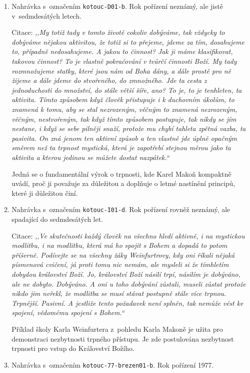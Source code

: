 \begin{enumerate}
  \item{
    Nahrávka s~označením \texttt{kotouc-D01-b}. Rok pořízení neznámý, ale
    jistě v~sedmdesátých letech.

    Citace: \textit{%
      ,,My totiž tady v tomto životě cokoliv dobýváme, tak vždycky to dobýváme
      nějakou aktivitou, že totiž si to přejeme, jdeme za tím, dosahujeme to,
      případně nedosahujeme. A jakou to činnost? Jak ji máme klasifikovat,
      takovou činnost? To je vlastně pokračování v tvůrčí činnosti Boží. My tady
      rozmnožujeme statky, které jsou nám od Boha dány, a dále prostě pro ně
      žijeme a dále jdeme do stvořeného, do zmnožného. Jde ta cesta z
      jednoduchosti do množství, do stále větší šíře, ano? To je, to je
      tenhleten, ta aktivita. Tímto způsobem když člověk přistupuje i k
      duchovním úkolům, to znamená k tomu, aby se stal nezrozeným, věčným to
      znamená nezrozeným, věčným, nestvořeným, tak když tímto způsobem
      postupuje, tak nikdy se jím nestane, i když se sebe pilněji snaží, protože
      mu chybí tahleta zpětná vazba, ta pasivita. On zná jenom ten aktivní
      způsob a ten vlastně jde úplně opačným směrem než ta trpnost mystická,
      která je zapotřebí stejnou měrou jako ta aktivita a kterou jedinou se
      můžete dostat nazpátek.``
    }

    Jedná se o fundamentální výrok o trpnosti, kde Karel Makoň kompaktně uvádí,
    proč ji považuje za důležitou a doplňuje o letmé nastínění principů, které
    ji důležitou činí.
  }
  \item{
    Nahrávka s~označením \texttt{kotouc-I01-d}. Rok pořízení rovněž neznámý, ale
    spadající do sedmdesátých let.

    Citace: \textit{%
      ,,Ve skutečnosti každý člověk na všechno hledí aktivně, i na mystickou
      modlitbu, i na modlitbu, která má ho spojit s Bohem a dopadá to potom
      příšerně. Podívejte se na všechny žáky Weinfurtrovy, kdy oni říkali
      nějaká písmenová cvičení, já proti tomu nic nemám, ale mysleli si že
      tímhletím dobydou království Boží. Jo, království Boží násilí trpí,
      násilím je dobýváno, ale ne dobyto. Dobýváno. A oni u toho dobývání
      zůstali, museli zůstat protože nikdo jim neřekl, že modlitba se musí
      stávat postupně stále více trpnou. Trpnější. Pasivní. A jestliže tento
      požadavek není splněn, tak nemůže vést ke spojení, vědomému spojení s
      Bohem.``
    }

    Příklad školy Karla Weinfurtera z~pohledu Karla Makoně je užita pro
    demonstraci nezbytnosti trpného přístupu. Je zde postulována nezbytnost
    trpnosti pro vstup do Království Božího.
  }
  \item{
      Nahrávka s~označením \texttt{kotouc-77-brezen01-b}. Rok pořízení 1977.

}
\end{enumerate}
